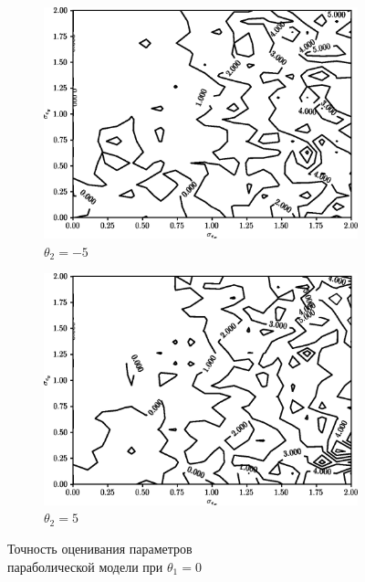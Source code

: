 \begin{figure}[p]
  \begin{subfigure}[b]{\linewidth}
    \centering
    \includegraphics[width=135mm]{fig/nonlinear/quadratic/alpha-0_beta--5.png}
    \caption{\( \theta_2 = -5 \)}
  \end{subfigure}

  \vspace{2\baselineskip}
  \begin{subfigure}[b]{\linewidth}
    \centering
    \includegraphics[width=135mm]{fig/nonlinear/quadratic/alpha-0_beta-5.png}
    \caption{\( \theta_2 = 5 \)}
  \end{subfigure}

  \vspace{\baselineskip}
    \caption{
      Точность оценивания параметров \\
      параболической модели при \( \theta_1 = 0 \)
    }\label{fig:comparison_nonlinear_quadratic_alpha-0}
\end{figure}

